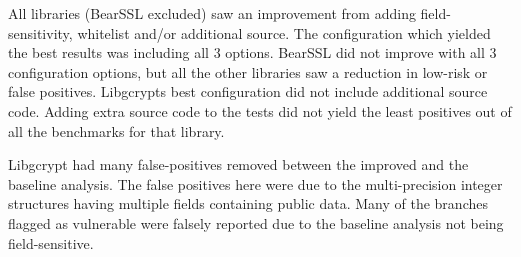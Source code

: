 \begin{table*}[!t]
  \centering
\caption{Result Classifications: Base - Baseline Positives, Improved - WL/FS/SRC
Positives}
  \label{tbl:allpositives}
\end{table*}


All libraries (BearSSL excluded) saw an improvement from adding
field-sensitivity, whitelist and/or additional source. The configuration which
yielded the best results was including all 3 options. BearSSL did not improve
with all 3 configuration options, but all the other libraries saw a reduction in
low-risk or false positives. Libgcrypts best configuration did not include
additional source code. Adding extra source code to the tests did not yield the
least positives out of all the benchmarks for that library.


Libgcrypt had many false-positives removed between the improved and the baseline
analysis. The false positives here were due to the multi-precision integer
structures having multiple fields containing public data. Many of the branches
flagged as vulnerable were falsely reported due to the baseline analysis not being field-sensitive.


